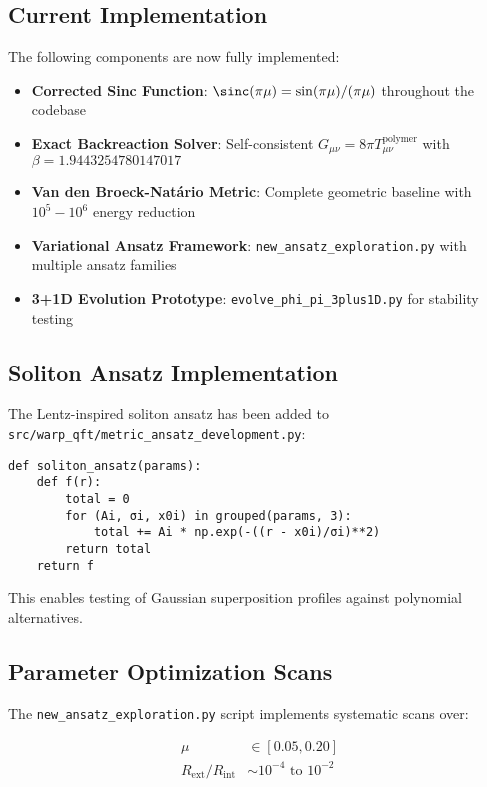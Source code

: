 \documentclass[12pt,a4paper]{article}
\begin{document}
\subsection{Current Implementation}

The following components are now fully implemented:

\begin{itemize}
\item \textbf{Corrected Sinc Function}: $\sinc(\pi\mu) = \sin(\pi\mu)/(\pi\mu)$ throughout the codebase
\item \textbf{Exact Backreaction Solver}: Self-consistent $G_{\mu\nu} = 8\pi T_{\mu\nu}^{\text{polymer}}$ with $\beta = 1.9443254780147017$
\item \textbf{Van den Broeck-Natário Metric}: Complete geometric baseline with $10^5-10^6$ energy reduction
\item \textbf{Variational Ansatz Framework}: \texttt{new\_ansatz\_exploration.py} with multiple ansatz families
\item \textbf{3+1D Evolution Prototype}: \texttt{evolve\_phi\_pi\_3plus1D.py} for stability testing
\end{itemize}

\subsection{Soliton Ansatz Implementation}

The Lentz-inspired soliton ansatz has been added to \texttt{src/warp\_qft/metric\_ansatz\_development.py}:

\begin{verbatim}
def soliton_ansatz(params):
    def f(r):
        total = 0
        for (Ai, σi, x0i) in grouped(params, 3):
            total += Ai * np.exp(-((r - x0i)/σi)**2)
        return total
    return f
\end{verbatim}

This enables testing of Gaussian superposition profiles against polynomial alternatives.

\subsection{Parameter Optimization Scans}

The \texttt{new\_ansatz\_exploration.py} script implements systematic scans over:

\begin{align}
\mu &\in [0.05, 0.20] \\
R_{\text{ext}}/R_{\text{int}} &\sim 10^{-4} \text{ to } 10^{-2}
\end{align}
\end{document}
